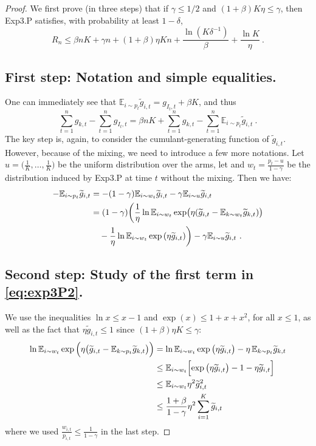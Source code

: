 \documentclass[11pt]{hackednow}
\newcommand{\E}{\mathbb{E}}
\renewcommand{\tilde}{\widetilde}
\begin{document}
\begin{proof}
We first prove (in three steps) that if $\gamma \leq 1/2$ and $(1+\beta) K \eta \leq \gamma$, then Exp3.P satisfies, with probability at least $1-\delta$,
\begin{equation} \label{eq:exp3Plem}
R_n \leq \beta n K + \gamma n + (1+\beta) \eta K n + \frac{\ln(K \delta^{-1})}{\beta} + \frac{\ln K}{\eta}~.
\end{equation}

\subsection*{First step: Notation and simple equalities.}
One can immediately see that $\E_{i \sim p_t} \tilde{g}_{i,t} = g_{I_t,t} + \beta K$, and thus
\begin{equation} \label{eq:exp3P1}
\sum_{t=1}^n g_{k,t} - \sum_{t=1}^n g_{I_t,t} = \beta n K  + \sum_{t=1}^n g_{k,t} - \sum_{t=1}^n \E_{i \sim p_t} \tilde{g}_{i,t}~.
\end{equation}
The key step is, again, to consider the cumulant-generating function of $\tilde{g}_{i,t}$. However, because of the mixing, we need to introduce a few more notations. Let $u=\bigl(\tfrac{1}{K},\hdots,\tfrac{1}{K}\bigr)$ be the uniform distribution over the arms, let and $w_t = \tfrac{p_t - u}{1-\gamma}$ be the distribution induced by Exp3.P at time $t$ without the mixing. Then we have:
\begin{align} 
- \E_{i \sim p_t} \tilde{g}_{i,t} & = - (1-\gamma) \E_{i \sim w_t} \tilde{g}_{i,t} - \gamma \E_{i \sim u} \tilde{g}_{i,t} \notag \\
& = (1-\gamma) \biggl( \frac{1}{\eta} \ln \E_{i \sim w_t} \exp \bigl( \eta (\tilde{g}_{i,t} - \E_{k \sim w_t} \tilde{g}_{k,t}) \bigr) \notag \\
& \quad - \frac{1}{\eta} \ln \E_{i \sim w_t} \exp\left( \eta \tilde{g}_{i,t} \right) \biggr) - \gamma \E_{i \sim u} \tilde{g}_{i,t}~. \label{eq:exp3P2} 
\end{align}

\subsection*{Second step: Study of the first term in \eqref{eq:exp3P2}.}
We use the inequalities $\ln x \leq x-1$ and $\exp(x) \leq 1 + x + x^2$, for all $x \leq 1$, as well as the fact that $\eta \tilde{g}_{i,t} \leq 1$ since $(1+\beta) \eta K \leq \gamma$:
\begin{align}
\ln \E_{i \sim w_t} \exp{\Bigl( \eta \bigl(\tilde{g}_{i,t} - \E_{k \sim p_t} \tilde{g}_{k,t}\bigr) \Bigr)} \notag
& = \ln \E_{i \sim w_t} \exp{\bigl( \eta \tilde{g}_{i,t}\bigr)} - \eta\,\E_{k \sim p_t} \tilde{g}_{k,t} \notag \\
&\leq \E_{i \sim w_t} \Bigl[\exp{\bigl( \eta \tilde{g}_{i,t}\bigr)} - 1 - \eta \tilde{g}_{i,t} \Bigr] \notag \\
&\leq \E_{i \sim w_t} \eta^2 \tilde{g}_{i,t}^2  \notag \\
&\leq \frac{1+\beta}{1-\gamma} \eta^2 \sum_{i=1}^K \tilde{g}_{i,t} \label{eq:exp3P3}
\end{align}
where we used $\frac{w_{i,t}}{p_{i,t}} \leq \frac{1}{1-\gamma}$ in the last step.


\end{proof}
\end{document}
